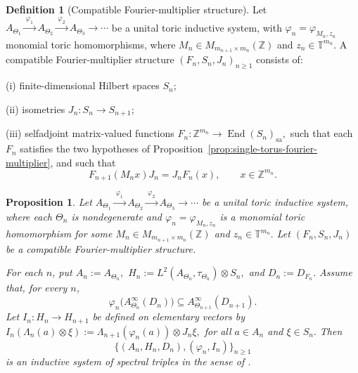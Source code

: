 \documentclass[11pt]{amsart}
\newtheorem{proposition}[theorem]{Proposition}
\theoremstyle{definition}
\newtheorem{definition}[theorem]{Definition}
\theoremstyle{remark}
\newcommand{\T}{\mathbb{T}}
\newcommand{\Z}{\mathbb{Z}}
\begin{document}
\begin{definition}[Compatible Fourier-multiplier structure]
\label{def:compatible-fourier-multiplier-data}
Let $A_{\Theta_1}\xrightarrow{\ \varphi_1\ }A_{\Theta_2}
\xrightarrow{\ \varphi_2\ }A_{\Theta_3}\xrightarrow{}\cdots$
be a unital toric inductive system, with $\varphi_n=\varphi_{M_n,z_n}$ monomial toric homomorphisms,  where $M_n\in M_{m_{n+1}\times m_n}(\Z)$ and $z_n\in\T ^{m_n}$.
A compatible Fourier-multiplier structure $(F_n,S_n,J_n)_{n\geq 1}$ consists of:
\smallskip

\noindent
 
 (i) finite-dimensional Hilbert spaces $S_n$;
\smallskip

\noindent
 
(ii)  isometries $J_n\colon S_n\to S_{n+1}$;

\smallskip

\noindent
 
(iii) selfadjoint matrix-valued functions $F_n\colon \Z^{m_n}\to\operatorname{End}(S_n)_{\mathrm{sa}},$
such that each $F_n$ satisfies the two hypotheses of
Proposition~\ref{prop:single-torus-fourier-multiplier}, and such that
\begin{equation}\label{eq:fourier-multiplier-compatibility}
F_{n+1}(M_nx)J_n=J_nF_n(x),
\qquad x\in\Z^{m_n}. \end{equation}
\end{definition}



\begin{proposition}%
\label{prop:unital-fourier-multiplier-triples}
Let $A_{\Theta_1}\xrightarrow{\ \varphi_1\ }A_{\Theta_2}
\xrightarrow{\ \varphi_2\ }A_{\Theta_3}\xrightarrow{}\cdots$
be a unital toric inductive system, where each $\Theta_n$ is nondegenerate and $\varphi_n=\varphi_{M_n,z_n}$
is a monomial toric homomorphism for some $M_n\in M_{m_{n+1}\times m_n}(\Z)$ and $z_n\in\T^{m_n}.$ Let $(F_n,S_n,J_n)$ be a compatible Fourier-multiplier structure. 

For each $n$, put $A_n:=A_{\Theta_n},$ $H_n:=L^2(A_{\Theta_n},\tau_{\Theta_n})\otimes S_n,$ and $D_n:=D_{F_n}.$ Assume that, for every $n$,
\begin{equation}\label{eq:spec-alg}\varphi_n\bigl(A_{\Theta_n}^{\infty}(D_n)\bigr)
\subseteq
A_{\Theta_{n+1}}^{\infty}(D_{n+1}).\end{equation} Let $I_n:H_n\to H_{n+1}$
be defined on elementary vectors by $I_n(\Lambda_n(a)\otimes\xi)
:=
\Lambda_{n+1}(\varphi_n(a))\otimes J_n\xi,$ for all 
$a\in A_n$ and $\xi\in S_n.$ Then \begin{equation}\label{eq:inds}\bigl\{(A_n,H_n,D_n),(\varphi_n,I_n)\bigr\}_{n\geq1}\end{equation}
is an inductive system of spectral triples in the sense of
\cite[Definitions~2.1--2.3]{FloricelGhorbanpour}.
\end{proposition}
\end{document}
